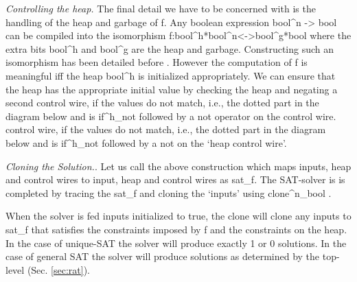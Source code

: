 \documentclass[preprint]{sigplanconf}
\newcommand{\xcomment}[2]{\textbf{#1:~\textsl{#2}}}
\newcommand{\roshan}[1]{\xcomment{Roshan}{#1}}
\begin{document}
\emph{Controlling the heap.}  The final detail we have to be concerned
with is the handling of the heap and garbage of {{f}}. Any boolean
expression {{bool^n -> bool}} can be compiled into the isomorphism
{{f:bool^h*bool^n<->bool^g*bool}} where the extra bits {{bool^h}} and
{{bool^g}} are the heap and garbage. Constructing such an isomorphism
has been detailed before \cite{Toffoli:1980,infeffects}.  However the
computation of {{f}} is meaningful {{iff}} the heap {{bool^h}} is
initialized appropriately. We can ensure that the heap has the
appropriate initial value by checking the heap and negating a second
control wire, if the values do not match, i.e., the dotted part in the
diagram below and is {{if^h_{not} }} followed by a {{not}} operator on
the control wire.
control wire, if the values do not match, i.e., the dotted part in
the diagram below and is {{if^h_{not} }} followed by a {{not}} on the
`heap control wire'.

\begin{center}
\end{center}  


\emph{Cloning the Solution.}.  Let us call the above construction
which maps inputs, heap and control wires to input, heap and control
wires as {{sat_f}}. The SAT-solver is is completed by tracing the
{{sat_f}} and cloning the `inputs' using {{clone^n_{bool} }}.

\begin{center}
\end{center}  

When the solver is fed inputs initialized to {{true}}, the {{clone}}
will clone any inputs to {{sat_f}} that satisfies the constraints
imposed by {{f}} and the constraints on the {{heap}}. In the case of
unique-SAT the solver will produce exactly 1 or 0 solutions. In the
case of general SAT the solver will produce solutions as determined by
the top-level (Sec. \ref{sec:rat}).
\end{document}
